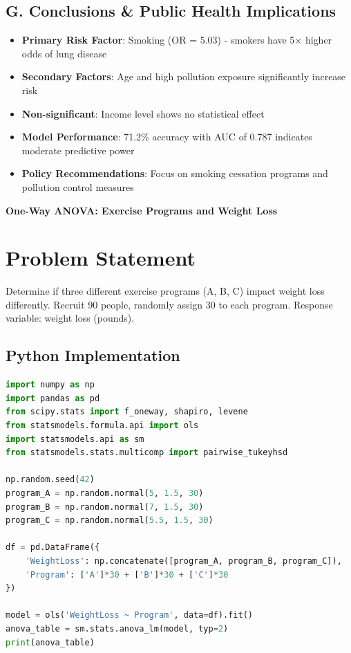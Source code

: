 \documentclass[12pt, a4paper]{article}
\newcounter{problemcounter}
\newcommand{\problemtitle}[1]{%
    \vspace{1cm}
    \begin{tcolorbox}[
        colback=DeepForest!5,
        colframe=DeepForest,
        arc=15pt,
        boxrule=1.2pt,
        left=20pt,
        right=20pt,
        top=12pt,
        bottom=12pt,
        enhanced,
        attach boxed title to top center={yshift=-8pt},
        boxed title style={
            colback=AmberSunset,
            colframe=DeepForest,
            arc=10pt,
            outer arc=10pt,
            boxrule=0.8pt,
            sharp corners,
            },
        title={\color{white}\large\sffamily\bfseries \faTasks \quad PROBLEM \arabic{problemcounter}}
    ]
        \centering
        {\color{DeepForest}\Large\bfseries\sffamily #1}
    \end{tcolorbox}
    \stepcounter{problemcounter}
    \vspace{0.3cm}
}
\begin{document}
\subsection*{G. Conclusions \& Public Health Implications}

\begin{itemize}
    \item \textbf{Primary Risk Factor}: Smoking (OR = 5.03) - smokers have 5× higher odds of lung disease
    \item \textbf{Secondary Factors}: Age and high pollution exposure significantly increase risk
    \item \textbf{Non-significant}: Income level shows no statistical effect
    \item \textbf{Model Performance}: 71.2\% accuracy with AUC of 0.787 indicates moderate predictive power
    \item \textbf{Policy Recommendations}: Focus on smoking cessation programs and pollution control measures
\end{itemize}

\newpage

\problemtitle{One-Way ANOVA: Exercise Programs and Weight Loss}

\section*{Problem Statement}
Determine if three different exercise programs (A, B, C) impact weight loss differently. Recruit 90 people, randomly assign 30 to each program. Response variable: weight loss (pounds).

\subsection*{Python Implementation}

\begin{lstlisting}[language=Python]
import numpy as np
import pandas as pd
from scipy.stats import f_oneway, shapiro, levene
from statsmodels.formula.api import ols
import statsmodels.api as sm
from statsmodels.stats.multicomp import pairwise_tukeyhsd

np.random.seed(42)
program_A = np.random.normal(5, 1.5, 30)
program_B = np.random.normal(7, 1.5, 30)
program_C = np.random.normal(5.5, 1.5, 30)

df = pd.DataFrame({
    'WeightLoss': np.concatenate([program_A, program_B, program_C]),
    'Program': ['A']*30 + ['B']*30 + ['C']*30
})

model = ols('WeightLoss ~ Program', data=df).fit()
anova_table = sm.stats.anova_lm(model, typ=2)
print(anova_table)
\end{lstlisting}
\end{document}
